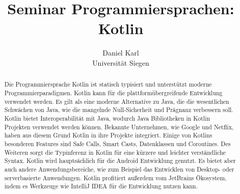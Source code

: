 \documentclass{article}
\title{Seminar Programmiersprachen: Kotlin}
\author{
  Daniel Karl\\
  {\small Universität Siegen}
}
\begin{document}
\maketitle

\begin{abstract}
 Die Programmiersprache Kotlin ist statisch typisiert und unterstützt moderne Programmierparadigmen. Kotlin kann für die plattformübergreifende Entwicklung verwendet werden. Es gilt als eine moderne Alternative zu Java, die die wesentlichen Schwächen von Java, wie die mangelnde Null-Sicherheit und Prägnanz verbessern soll. Kotlin bietet Interoperabilität mit Java, wodurch Java Bibliotheken in Kotlin Projekten verwendet werden können. Bekannte Unternehmen, wie Google und Netflix, haben aus diesem Grund Kotlin in ihre Projekte integriert. Einige von Kotlins besonderen Features sind Safe Calls, Smart Casts, Datenklassen und Coroutines. Des Weiteren sorgt die Typinferenz in Kotlin für eine kürzere und leichter verständliche Syntax. Kotlin wird hauptsächlich für die Android Entwicklung genutzt. Es bietet aber auch andere Anwendungsbereiche, wie zum Beispiel das Entwicklen von Desktop- oder serverbasierte Anwendungen. Kotlin profitiert außerdem vom JetBrains Ökosystem, indem es Werkzeuge wie IntelliJ IDEA für die Entwicklung nutzen kann.
\end{abstract}
\end{document}
